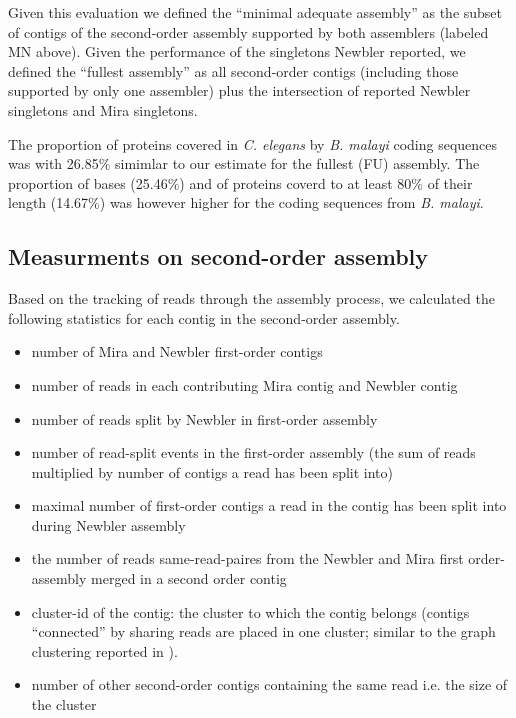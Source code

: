\documentclass[12pt,a4paper]{article}
\begin{document}
Given this evaluation we defined the ``minimal adequate assembly'' as
the subset of contigs of the second-order assembly supported by both
assemblers (labeled MN above). Given the performance of the singletons
Newbler reported, we defined the ``fullest assembly'' as all
second-order contigs (including those supported by only one assembler)
plus the intersection of reported Newbler singletons and Mira
singletons.

The proportion of proteins covered in \textit{C. elegans} by
\textit{B. malayi} coding sequences was with
26.85\% simimlar to our estimate for
the fullest (FU) assembly. The proportion of bases
(25.46\%) and of proteins coverd to
at least 80\% of their length
(14.67\%) was however higher for
the coding sequences from \textit{B. malayi}.

\subsection{Measurments on second-order assembly}

Based on the tracking of reads through the assembly process, we
calculated the following statistics for each contig in the
second-order assembly.

\begin{itemize}
\item number of Mira and Newbler first-order contigs
\item number of reads in each contributing Mira contig and Newbler
  contig
\item number of reads split by Newbler in first-order assembly
\item number of read-split events in the first-order assembly (the sum
  of reads multiplied by number of contigs a read has been split into)
\item maximal number of first-order contigs a read in the contig has
  been split into during Newbler assembly
\item the number of reads same-read-paires from the Newbler and Mira
  first order-assembly merged in a second order contig
\item cluster-id of the contig: the cluster to which the contig
  belongs (contigs ``connected'' by sharing reads are placed in one
  cluster; similar to the graph clustering reported in
  \cite{pmid21138572}).
\item number of other second-order contigs containing the same read
  i.e. the size of the cluster
\end{itemize}
\end{document}

